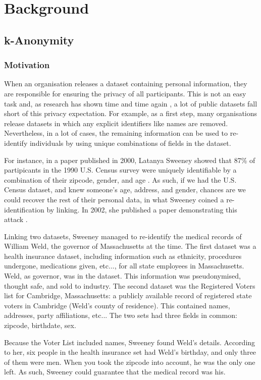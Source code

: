 \chapter{Background}
\section{k-Anonymity}
\subsection{Motivation}
When an organisation releases a dataset containing personal information, they are responsible for ensuring the privacy of all participants. This is not an easy task and, as research has shown time and time again \cite{sweeney_uniqueness, rocher_estimating_reid, kanon_orig}, a lot of public datasets fall short of this privacy expectation. For example, as a first step, many organisations release datasets in which any explicit identifiers like names are removed. Nevertheless, in a lot of cases, the remaining information can be used to re-identify individuals by using unique combinations of fields in the dataset. 

For instance, in a paper published in 2000, Latanya Sweeney showed that 87\% of partipicants in the 1990 U.S. Census survey were uniquely identifiable by a combination of their zipcode, gender, and age \cite{sweeney_uniqueness}. As such, if we had the U.S. Census dataset, and knew someone's age, address, and gender, chances are we could recover the rest of their personal data, in what Sweeney coined a re-identification by linking. In 2002, she published a paper demonstrating this attack \cite{kanon_orig}.

Linking two datasets, Sweeney managed to re-identify the medical records of William Weld, the governor of Massachusetts at the time. The first dataset was a health insurance dataset, including information such as ethnicity, procedures undergone, medications given, etc..., for all state employees in Massachusetts. Weld, as governor, was in the dataset. This information was pseudonymised, thought safe, and sold to industry. The second dataset was the Registered Voters list for Cambridge, Massachusetts: a publicly available record of registered state voters in Cambridge (Weld's county of residence). This contained names, addresses, party affiliations, etc... The two sets had three fields in common: zipcode, birthdate, sex.

Because the Voter List included names, Sweeney found Weld's details. According to her, six people in the health insurance set had Weld's birthday, and only three of them were men. When you took the zipcode into account, he was the only one left. As such, Sweeney could guarantee that the medical record was his.

